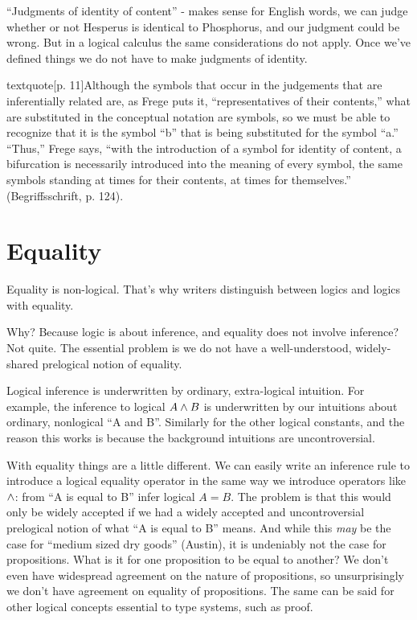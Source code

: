 \documentclass{article}
\begin{document}
``Judgments of identity of content'' - makes sense for English words,
we can judge whether or not Hesperus is identical to Phosphorus, and
our judgment could be wrong. But in a logical calculus the same
considerations do not apply. Once we've defined things we do not have
to make judgments of identity.

textquote[p. 11]{Although the symbols that occur in the judgements
  that are inferentially related are, as Frege puts it,
  “representatives of their contents,” what are substituted in the
  conceptual notation are symbols, so we must be able to recognize
  that it is the symbol “b” that is being substituted for the symbol
  “a.” “Thus,” Frege says, “with the introduction of a symbol for
  identity of content, a bifurcation is necessarily introduced into
  the meaning of every symbol, the same symbols standing at times for
  their contents, at times for themselves.” (Begriffsschrift, p.
  124).}



\section{Equality}

Equality is non-logical. That's why writers distinguish between logics
and logics with equality.

Why? Because logic is about inference, and equality does not involve
inference? Not quite. The essential problem is we do not have a well-understood, widely-shared prelogical notion of equality.

Logical inference is underwritten by ordinary, extra-logical
intuition. For example, the inference to logical \(A\land B\) is
underwritten by our intuitions about ordinary, nonlogical ``A and B''.
Similarly for the other logical constants, and the reason this works
is because the background intuitions are uncontroversial.

With equality things are a little different. We can easily write an
inference rule to introduce a logical equality operator in the same
way we introduce operators like \(\land\): from ``A is equal to B''
infer logical \(A=B\). The problem is that this would only be widely
accepted if we had a widely accepted and uncontroversial prelogical
notion of what ``A is equal to B'' means. And while this \textit{may}
be the case for ``medium sized dry goods'' (Austin), it is undeniably
not the case for propositions. What is it for one proposition to be
equal to another? We don't even have widespread agreement on the
nature of propositions, so unsurprisingly we don't have agreement on
equality of propositions. The same can be said for other logical
concepts essential to type systems, such as proof.
\end{document}
